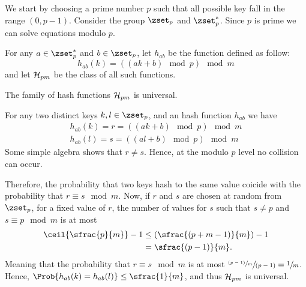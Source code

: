 \documentclass{subfiles}
\begin{document}
    We start by choosing a prime number \(p\) such that all possible key fall in the range 
        \((0, p - 1)\). Consider the group \(\zset_{p}\) and \(\zset_{p}^{*}\).
        Since \(p\) is prime we can solve equations modulo \(p\). 
    
    For any \(a \in \zset_{p}^{*}\) and \(b \in \zset_{p}\), 
        let \(h_{ab}\) be the  function defined as follow:
        \[
            h_{ab}(k) =  ((ak + b) \mod p) \mod m
        \]
        and let \(\mathcal{H}_{pm}\) be the class of all such functions.
    
    \begin{theorem}
        The family of hash functions \(\mathcal{H}_{pm}\) is universal.
    \end{theorem}
    \begin{proof*}
        For any two distinct keys \(k, l \in \zset_{p}\), and an hash function \(h_{ab}\) we have 
            \[\begin{gathered}
                h_{ab}(k) = r = ((ak + b) \mod p) \mod m \\ 
                h_{ab}(l) = s = ((al + b) \mod p) \mod m
            \end{gathered}\]
            Some simple algebra shows that \(r \ne s\). Hence,
            at the modulo \(p\) level no collision can occur.

        Therefore, the probability that two keys hash to the same value coicide with
            the probability that \(r \equiv s \mod m\). Now, if \(r\) and \(s\) are chosen at random 
            from \(\zset_{p}\), for a fixed value of \(r\),
            the number of values for \(s\) such that \(s \ne p\) and \(s \equiv p \mod m\) is at most
            \[\begin{aligned}
                \ceil{\sfrac{p}{m}} - 1 & \le (\sfrac{(p + m - 1)}{m}) - 1 \\ 
                & = \sfrac{(p - 1)}{m}.
            \end{aligned}\]
            Meaning that the probability that \(r \equiv s \mod m\) is at most \(\sfrac{\sfrac{(p - 1)}{m}}{(p - 1)} = \sfrac{1}{m}\).
            Hence, \(\Prob{h_{ab}(k) = h_{ab}(l)} \le \sfrac{1}{m}\), and thus \(\mathcal{H}_{pm}\) is universal.
    \end{proof*}
\end{document}
